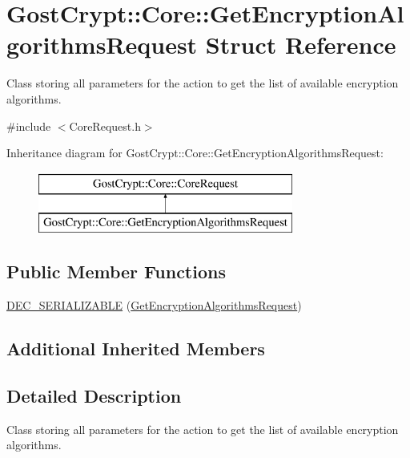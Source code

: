 \hypertarget{struct_gost_crypt_1_1_core_1_1_get_encryption_algorithms_request}{}\section{Gost\+Crypt\+:\+:Core\+:\+:Get\+Encryption\+Algorithms\+Request Struct Reference}
\label{struct_gost_crypt_1_1_core_1_1_get_encryption_algorithms_request}


Class storing all parameters for the action to get the list of available encryption algorithms.  




{\ttfamily \#include $<$Core\+Request.\+h$>$}

Inheritance diagram for Gost\+Crypt\+:\+:Core\+:\+:Get\+Encryption\+Algorithms\+Request\+:\begin{figure}[H]
\begin{center}
\leavevmode
\includegraphics[height=2.000000cm]{struct_gost_crypt_1_1_core_1_1_get_encryption_algorithms_request}
\end{center}
\end{figure}
\subsection*{Public Member Functions}
\begin{DoxyCompactItemize}
\item 
\hyperlink{struct_gost_crypt_1_1_core_1_1_get_encryption_algorithms_request_a21bc1b284c53e98a14b0f26e7960e82d}{D\+E\+C\+\_\+\+S\+E\+R\+I\+A\+L\+I\+Z\+A\+B\+LE} (\hyperlink{struct_gost_crypt_1_1_core_1_1_get_encryption_algorithms_request}{Get\+Encryption\+Algorithms\+Request})
\end{DoxyCompactItemize}
\subsection*{Additional Inherited Members}


\subsection{Detailed Description}
Class storing all parameters for the action to get the list of available encryption algorithms. 

